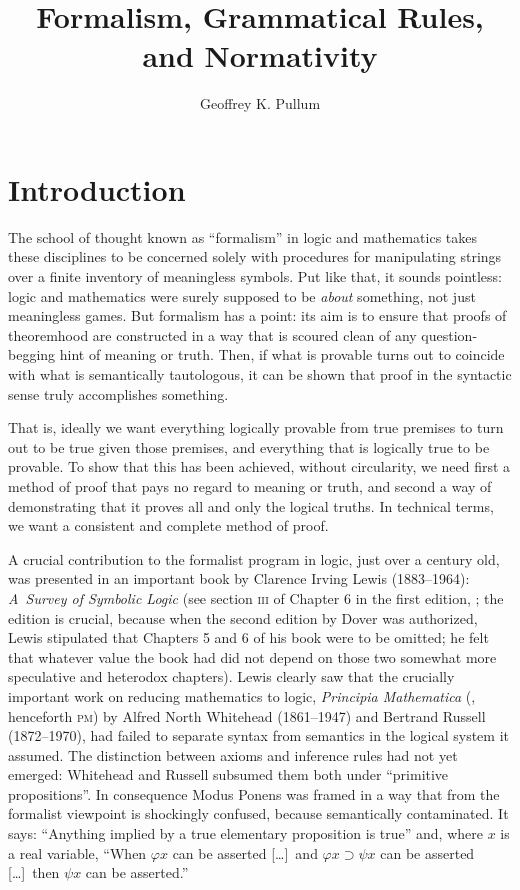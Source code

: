 \documentclass[output=paper]{langscibook}
\author{Geoffrey K. Pullum\affiliation{University of Edinburgh}}
\title{Formalism, Grammatical Rules, and Normativity}
\begin{document}
\maketitle

\section{Introduction}
\label{sec:pullum:intro}

The school of thought known as ``formalism'' in logic and mathematics takes these disciplines to be concerned solely with procedures for manipulating strings over a finite inventory of meaningless symbols.  Put like that, it sounds pointless: logic and mathematics were surely supposed to be \emph{about} something, not just meaningless games. But formalism has a point: its aim is to ensure that proofs of theoremhood are constructed in a way that is scoured clean of any question-begging hint of meaning or truth.  Then, if what is provable turns out to coincide with what is semantically tautologous, it can be shown that proof in the syntactic sense truly accomplishes something.

That is, ideally we want everything logically provable from true premises to turn out to be true given those premises, and everything that is logically true to be provable. To show that this has been achieved, without circularity, we need first a method of proof that pays no regard to meaning or truth, and second a way of demonstrating that it proves all and only the logical truths. In technical terms, we want a consistent and complete method of proof.

A crucial contribution to the formalist program in logic, just over a century old, was presented in an important book by Clarence Irving Lewis (1883--1964): \textit{A~Survey of Symbolic Logic} (see section \textsc{iii} of Chapter 6 in the first edition, \citeyear{Lewis18}; the edition is crucial, because when the second edition by Dover was authorized, Lewis stipulated that Chapters 5 and 6 of his book were to be omitted; he felt that whatever value the book had did not depend on those two somewhat more speculative and heterodox chapters). Lewis clearly saw that the crucially important work on reducing mathematics to logic, \textit{Principia Mathematica} (\citeyear{WhitRussPM}, henceforth \textsc{pm}) by Alfred North Whitehead (1861--1947) and Bertrand Russell (1872--1970), had failed to separate syntax from semantics in the logical system it assumed. The distinction between axioms and inference rules had not yet emerged: Whitehead and Russell subsumed them both under ``primitive propositions''. In consequence Modus Ponens was framed in a way that from the formalist viewpoint is shockingly confused, because semantically contaminated. It says: ``Anything implied by a true elementary proposition is true'' and, where $x$ is a real variable, ``When $\varphi x$ can be asserted [\ldots]\ and $\varphi x \supset \psi x$ can be asserted [\ldots]\ then $\psi x$ can be asserted.''
\end{document}
